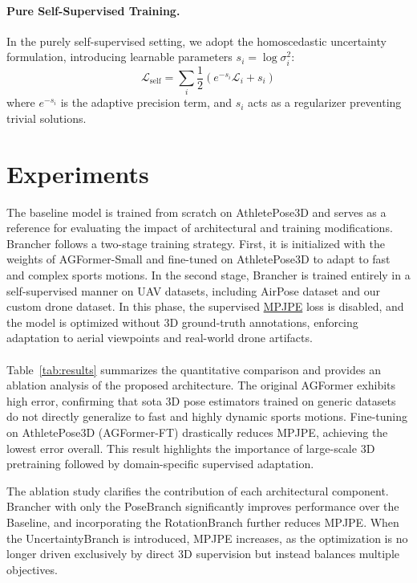 \documentclass[11pt,a4paper,twocolumn]{article}
\begin{document}
\paragraph{Pure Self-Supervised Training.}
In the purely self-supervised setting, we adopt the homoscedastic uncertainty formulation, introducing learnable parameters $s_i = \log \sigma_i^2$:
\begin{equation}
\mathcal{L}_{\text{self}} =
\sum_{i}
\frac{1}{2}
\left(
e^{-s_i}\mathcal{L}_i + s_i
\right)
\end{equation}
where $e^{-s_i}$ is the adaptive precision term, and $s_i$ acts as a regularizer preventing trivial solutions.

\section{Experiments}
The baseline model is trained from scratch on AthletePose3D \cite{yeung2025athletepose3d} and serves as a reference for evaluating the impact of architectural and training modifications.
Brancher follows a two-stage training strategy. First, it is initialized with the weights of AGFormer-Small \cite{mehraban2024motionagformer} and fine-tuned on AthletePose3D to adapt to fast and complex sports motions. 
In the second stage, Brancher is trained entirely in a self-supervised manner on UAV datasets, including AirPose dataset \cite{saini2022airpose} and our custom drone dataset. In this phase, the supervised \hyperref[eq:mpjpe]{MPJPE} 
loss is disabled, and the model is optimized without 3D ground-truth annotations, enforcing adaptation to aerial viewpoints and real-world drone artifacts.
\\\\
Table~\ref{tab:results} summarizes the quantitative comparison and provides an ablation analysis of the proposed architecture.
The original AGFormer exhibits high error, confirming that sota 3D pose estimators trained on generic datasets do not directly generalize to fast and highly dynamic sports motions. Fine-tuning on 
AthletePose3D (AGFormer-FT) drastically reduces MPJPE, achieving the lowest error overall. This result highlights the importance of large-scale 3D pretraining followed by domain-specific supervised 
adaptation.

The ablation study clarifies the contribution of each architectural component. Brancher with only the PoseBranch significantly improves performance over the Baseline, and incorporating the RotationBranch 
further reduces MPJPE. When the UncertaintyBranch is introduced, MPJPE increases, as the optimization is no longer driven exclusively by direct 3D supervision but instead balances multiple 
objectives.
\end{document}

